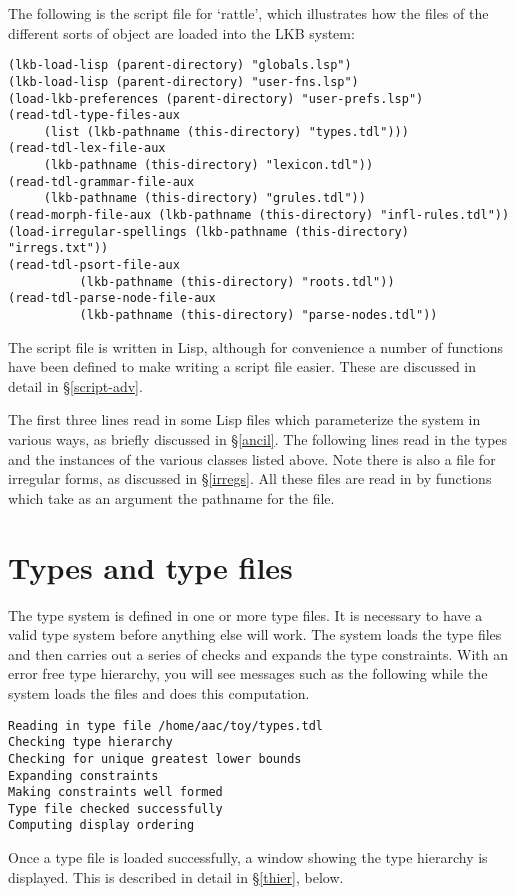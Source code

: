 \documentclass[12pt]{report}
\begin{document}
The following is the script file for `rattle', which illustrates
how the files of the different sorts of object are loaded into the 
LKB system:
\begin{verbatim}
(lkb-load-lisp (parent-directory) "globals.lsp")
(lkb-load-lisp (parent-directory) "user-fns.lsp")
(load-lkb-preferences (parent-directory) "user-prefs.lsp")
(read-tdl-type-files-aux
     (list (lkb-pathname (this-directory) "types.tdl")))
(read-tdl-lex-file-aux 
     (lkb-pathname (this-directory) "lexicon.tdl"))
(read-tdl-grammar-file-aux 
     (lkb-pathname (this-directory) "grules.tdl"))
(read-morph-file-aux (lkb-pathname (this-directory) "infl-rules.tdl"))
(load-irregular-spellings (lkb-pathname (this-directory) "irregs.txt"))
(read-tdl-psort-file-aux 
          (lkb-pathname (this-directory) "roots.tdl"))
(read-tdl-parse-node-file-aux 
          (lkb-pathname (this-directory) "parse-nodes.tdl"))
\end{verbatim}
The script file is written in Lisp, although for convenience
a number of functions have been defined to make writing a script file
easier.  These are discussed in detail in \S\ref{script-adv}.

The first three lines read in some Lisp files which parameterize the
system in various ways, as briefly discussed in \S\ref{ancil}.
The following lines read in the types and the instances of the various
classes listed above.  Note there is also a file for irregular
forms, as discussed in \S\ref{irregs}.  All these files are read
in by functions which take as an argument the pathname for the file.


\section{Types and type files}

The type system is defined in one or more type files.  It is necessary
to have a valid type system before anything else will work.
The system loads the type files and then carries out a series of
checks and expands the type constraints.
With an error free type hierarchy, you will see messages such as the
following while the system loads the files and
does this computation.
\begin{verbatim}
Reading in type file /home/aac/toy/types.tdl
Checking type hierarchy
Checking for unique greatest lower bounds
Expanding constraints
Making constraints well formed
Type file checked successfully
Computing display ordering
\end{verbatim}
Once a type file is loaded successfully, a window showing the type
hierarchy is displayed. 
This is described in detail in \S\ref{thier}, below.
\end{document}
